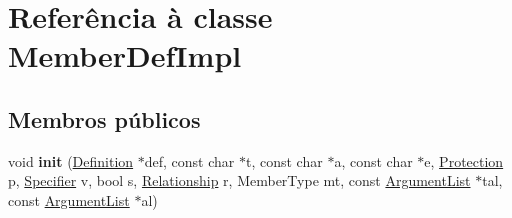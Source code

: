 \hypertarget{class_member_def_impl}{\section{Referência à classe Member\-Def\-Impl}
\label{class_member_def_impl}
}
\subsection*{Membros públicos}
\begin{DoxyCompactItemize}
\item 
\hypertarget{class_member_def_impl_a377256593cc02abe7259493be16c4ef8}{void {\bfseries init} (\hyperlink{class_definition}{Definition} $\ast$def, const char $\ast$t, const char $\ast$a, const char $\ast$e, \hyperlink{types_8h_a90e352184df58cd09455fe9996cd4ded}{Protection} p, \hyperlink{types_8h_ab16236bdd10ddf4d73a9847350f0017e}{Specifier} v, bool s, \hyperlink{types_8h_a9d625fe894d9313ec78df1d78553f32e}{Relationship} r, Member\-Type mt, const \hyperlink{class_argument_list}{Argument\-List} $\ast$tal, const \hyperlink{class_argument_list}{Argument\-List} $\ast$al)}\label{class_member_def_impl_a377256593cc02abe7259493be16c4ef8}

\end{DoxyCompactItemize}
